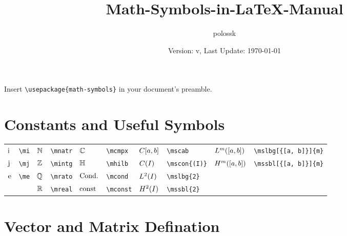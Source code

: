 \documentclass{article}
\title{Math-Symbols-in-\LaTeX{}-Manual}
\author{polossk}
\date{Version: v\artversion, Last Update: \today}
\begin{document}
\maketitle

Insert \lstinline`\usepackage{math-symbols}` in your document's preamble.

\tableofcontents
\thispagestyle{fancy}
\renewcommand{\baselinestretch}{1.25}
\sWuhao\fSong
\section{Constants and Useful Symbols}
\begin{tabular}{*{10}{l}}
$\mi$ & \lstinline`\mi` & $\mnatr$ & \lstinline`\mnatr` & $\mcmpx$ & \lstinline`\mcmpx` & $\mscab$ & \lstinline`\mscab` & $\mslbg[{[a, b]}]{m}$ & \lstinline`\mslbg[{[a, b]}]{m}`\\
$\mj$ & \lstinline`\mj` & $\mintg$ & \lstinline`\mintg` & $\mhilb$ & \lstinline`\mhilb` & $\mscon{(I)}$ & \lstinline`\mscon{(I)}` & $\mssbl[{[a, b]}]{m}$ & \lstinline`\mssbl[{[a, b]}]{m}`\\
$\me$ & \lstinline`\me` & $\mrato$ & \lstinline`\mrato` & $\mcond$ & \lstinline`\mcond` & $\mslbg{2}$ & \lstinline`\mslbg{2}` & \\
 &  & $\mreal$ & \lstinline`\mreal` & $\mconst$ & \lstinline`\mconst` & $\mssbl{2}$ & \lstinline`\mssbl{2}` & \\
\end{tabular}

\section{Vector and Matrix Defination}
\end{document}
